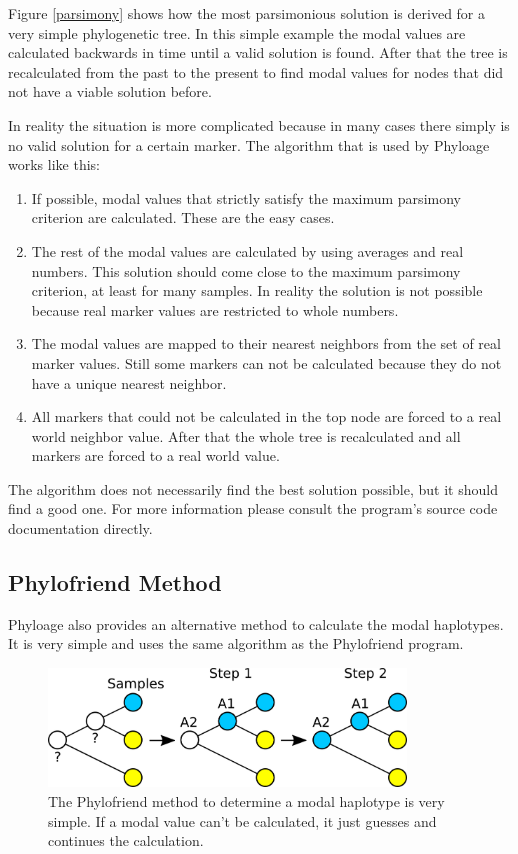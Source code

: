 Figure \ref{parsimony} shows how the most parsimonious solution
is derived for a very simple phylogenetic tree. In this simple
example the modal values are calculated backwards in time until
a valid solution is found. After that the tree is recalculated
from the past to the present to find modal values for nodes that
did not have a viable solution before.

In reality the situation is more complicated because in many
cases there simply is no valid solution for a certain marker.
The algorithm that is used by Phyloage works like this:

\begin{enumerate}
\item If possible, modal values that strictly satisfy the
	maximum parsimony criterion are calculated. These are
	the easy cases.
\item The rest of the modal values are calculated by using
	averages and real numbers. This solution should come
	close to the maximum parsimony criterion, at least for
	many samples. In reality the solution is not possible
	because real marker values are restricted to whole numbers.
\item The modal values are mapped to their nearest neighbors
	from the set of real marker values. Still some markers
	can not be calculated because they do not have a unique
	nearest neighbor.
\item All markers that could not be calculated in the top
	node are forced to a real world neighbor value. After
	that the whole tree is recalculated and all markers are
	forced to a real world value.
\end{enumerate}

The algorithm does not necessarily find the best solution
possible, but it should find a good one. For more information
please consult the program's source code documentation
\cite{PhyloageSourceDoc} directly.


\subsection{Phylofriend Method}

Phyloage also provides an alternative method to calculate
the modal haplotypes. It is very simple and uses the same
algorithm as the Phylofriend \cite{Phylofriend} program.

\begin{figure}[ht]
\centering
\includegraphics[width=9.5cm]{img/phylofriend.png}
\caption{\label{phylofriend} The Phylofriend method to
determine a modal haplotype is very simple. If a modal
value can't be calculated, it just guesses and continues
the calculation.}
\end{figure}

